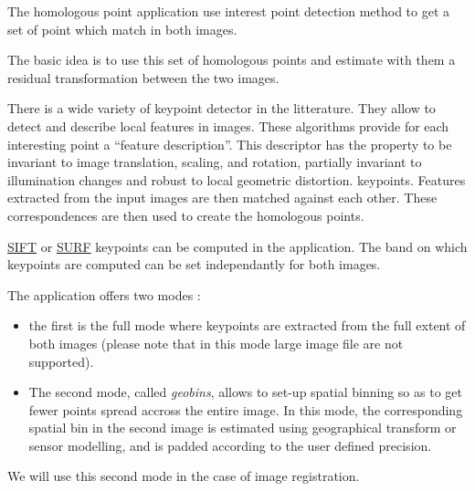 The homologous point application use interest point detection method to get a set of
point which match in both images.

The basic idea is to use this set of homologous points and estimate with them a
residual transformation between the two images.

There is a wide variety of keypoint detector in the litterature. They allow to detect and describe local features in images. These algorithms provide for each interesting point a ``feature description''. This descriptor has the property to be invariant to image translation, scaling, and rotation, partially invariant to illumination changes and robust to local geometric distortion.
keypoints.
Features extracted from the input images are then matched against each other. These correspondences are then used to create the homologous points.

\href{http://en.wikipedia.org/wiki/Scale-invariant_feature_transform}{SIFT} or \href{http://en.wikipedia.org/wiki/SURF}{SURF} keypoints can be computed in the application. The band on which keypoints
are computed can be set independantly for both images.

The application offers two modes :
\begin{itemize}
\item the first is the full mode where keypoints
are extracted from the full extent of both images (please note that in this mode
large image file are not supported).
\item The second mode, called \textit{geobins},
allows to set-up spatial binning so as to get fewer points spread accross the
entire image. In this mode, the corresponding spatial bin in the second image is
estimated using geographical transform or sensor modelling, and is padded
according to the user defined precision.
\end{itemize}

We will use this second mode in the
case of image registration.

